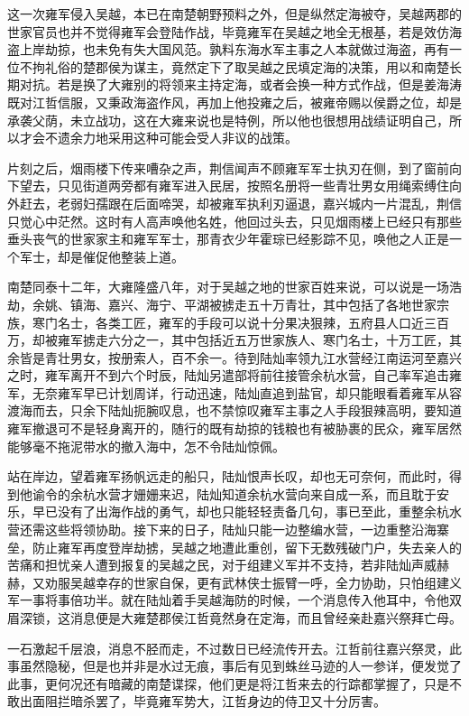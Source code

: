 这一次雍军侵入吴越，本已在南楚朝野预料之外，但是纵然定海被夺，吴越两郡的世家官员也并不觉得雍军会登陆作战，毕竟雍军在吴越之地全无根基，若是效仿海盗上岸劫掠，也未免有失大国风范。孰料东海水军主事之人本就做过海盗，再有一位不拘礼俗的楚郡侯为谋主，竟然定下了取吴越之民填定海的决策，用以和南楚长期对抗。若是换了大雍别的将领来主持定海，或者会换一种方式作战，但是姜海涛既对江哲信服，又秉政海盗作风，再加上他投雍之后，被雍帝赐以侯爵之位，却是承袭父荫，未立战功，这在大雍来说也是特例，所以他也很想用战绩证明自己，所以才会不遗余力地采用这种可能会受人非议的战策。

片刻之后，烟雨楼下传来嘈杂之声，荆信闻声不顾雍军军士执刃在侧，到了窗前向下望去，只见街道两旁都有雍军进入民居，按照名册将一些青壮男女用绳索缚住向外赶去，老弱妇孺跟在后面啼哭，却被雍军执利刃逼退，嘉兴城内一片混乱，荆信只觉心中茫然。这时有人高声唤他名姓，他回过头去，只见烟雨楼上已经只有那些垂头丧气的世家家主和雍军军士，那青衣少年霍琮已经影踪不见，唤他之人正是一个军士，却是催促他整装上道。

南楚同泰十二年，大雍隆盛八年，对于吴越之地的世家百姓来说，可以说是一场浩劫，余姚、镇海、嘉兴、海宁、平湖被掳走五十万青壮，其中包括了各地世家宗族，寒门名士，各类工匠，雍军的手段可以说十分果决狠辣，五府县人口近三百万，却被雍军掳走六分之一，其中包括近五万世家族人、寒门名士，十万工匠，其余皆是青壮男女，按册索人，百不余一。待到陆灿率领九江水营经江南运河至嘉兴之时，雍军离开不到六个时辰，陆灿另遣部将前往接管余杭水营，自己率军追击雍军，无奈雍军早已计划周详，行动迅速，陆灿直追到盐官，却只能眼看着雍军从容渡海而去，只余下陆灿扼腕叹息，也不禁惊叹雍军主事之人手段狠辣高明，要知道雍军撤退可不是轻身离开的，随行的既有劫掠的钱粮也有被胁裹的民众，雍军居然能够毫不拖泥带水的撤入海中，怎不令陆灿惊佩。

站在岸边，望着雍军扬帆远走的船只，陆灿恨声长叹，却也无可奈何，而此时，得到他谕令的余杭水营才姗姗来迟，陆灿知道余杭水营向来自成一系，而且耽于安乐，早已没有了出海作战的勇气，却也只能轻轻责备几句，事已至此，重整余杭水营还需这些将领协助。接下来的日子，陆灿只能一边整编水营，一边重整沿海寨垒，防止雍军再度登岸劫掳，吴越之地遭此重创，留下无数残破门户，失去亲人的苦痛和担忧亲人遭到报复的吴越之民，对于组建义军并不支持，若非陆灿声威赫赫，又劝服吴越幸存的世家自保，更有武林侠士振臂一呼，全力协助，只怕组建义军一事将事倍功半。就在陆灿着手吴越海防的时候，一个消息传入他耳中，令他双眉深锁，这消息便是大雍楚郡侯江哲竟然身在定海，而且曾经亲赴嘉兴祭拜亡母。

一石激起千层浪，消息不胫而走，不过数日已经流传开去。江哲前往嘉兴祭灵，此事虽然隐秘，但是也并非是水过无痕，事后有见到蛛丝马迹的人一参详，便发觉了此事，更何况还有暗藏的南楚谍探，他们更是将江哲来去的行踪都掌握了，只是不敢出面阻拦暗杀罢了，毕竟雍军势大，江哲身边的侍卫又十分厉害。

